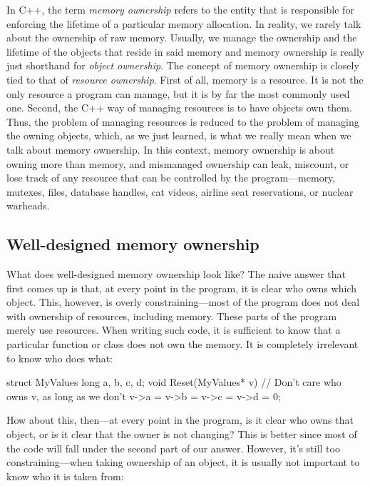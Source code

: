 In C++, the term \emph{memory ownership} refers to the entity that is responsible for enforcing the lifetime of a particular memory allocation. In reality, we rarely talk about the ownership of raw memory. Usually, we manage the ownership and the lifetime of the objects that reside in said memory and memory ownership is really just shorthand for \emph{object ownership}. The concept of memory ownership is closely tied to that of \emph{resource ownership}. First of all, memory is a resource. It is not the only resource a program can manage, but it is by far the most commonly used one. Second, the C++ way of managing resources is to have objects own them. Thus, the problem of managing resources is reduced to the problem of managing the owning objects, which, as we just learned, is what we really mean when we talk about memory ownership. In this context, memory ownership is about owning more than memory, and mismanaged ownership can leak, miscount, or lose track of any resource that can be controlled by the program---memory, mutexes, files, database handles, cat videos, airline seat reservations, or nuclear warheads.

\subsection{Well-designed memory ownership}

What does well-designed memory ownership look like? The naive answer that first comes up is that, at every point in the program, it is clear who owns which object. This, however, is overly constraining---most of the program does not deal with ownership of resources, including memory. These parts of the program merely use resources. When writing such code, it is sufficient to know that a particular function or class does not own the memory. It is completely irrelevant to know who does what:

\begin{code}
struct MyValues { long a, b, c, d; }
void Reset(MyValues* v) {
  // Don't care who owns v, as long as we don't
  v->a = v->b = v->c = v->d = 0;
}
\end{code}

How about this, then---at every point in the program, is it clear who owns that object, or is it clear that the owner is not changing? This is better since most of the code will fall under the second part of our answer. However, it's still too constraining---when taking ownership of an object, it is usually not important to know who it is taken from:


